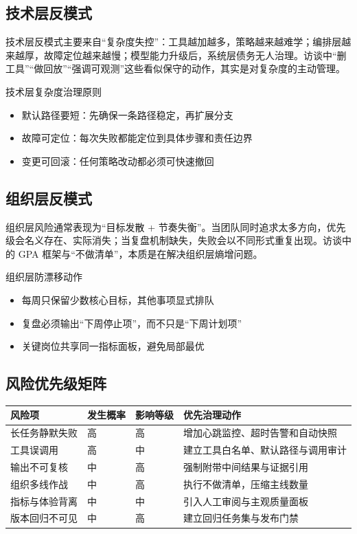 \documentclass[a4paper]{article}
\begin{document}
\subsection{技术层反模式}

技术层反模式主要来自“复杂度失控”：工具越加越多，策略越来越难学；编排层越来越厚，故障定位越来越慢；模型能力升级后，系统层债务无人治理。访谈中“删工具”“做回放”“强调可观测”这些看似保守的动作，其实是对复杂度的主动管理。

\begin{knowledgebox}{技术层复杂度治理原则}
\begin{itemize}
    \item 默认路径要短：先确保一条路径稳定，再扩展分支
    \item 故障可定位：每次失败都能定位到具体步骤和责任边界
    \item 变更可回滚：任何策略改动都必须可快速撤回
\end{itemize}
\end{knowledgebox}

\subsection{组织层反模式}

组织层风险通常表现为“目标发散 + 节奏失衡”。当团队同时追求太多方向，优先级会名义存在、实际消失；当复盘机制缺失，失败会以不同形式重复出现。访谈中的 GPA 框架与“不做清单”，本质是在解决组织层熵增问题。

\begin{importantbox}{组织层防漂移动作}
\begin{itemize}
    \item 每周只保留少数核心目标，其他事项显式排队
    \item 复盘必须输出“下周停止项”，而不只是“下周计划项”
    \item 关键岗位共享同一指标面板，避免局部最优
\end{itemize}
\end{importantbox}

\subsection{风险优先级矩阵}

\begin{center}
\begin{tabular}{p{3.2cm}p{2.1cm}p{2.1cm}p{5.4cm}}
\toprule
风险项 & 发生概率 & 影响等级 & 优先治理动作 \\
\midrule
长任务静默失败 & 高 & 高 & 增加心跳监控、超时告警和自动快照 \\
工具误调用 & 高 & 中 & 建立工具白名单、默认路径与调用审计 \\
输出不可复核 & 中 & 高 & 强制附带中间结果与证据引用 \\
组织多线作战 & 中 & 高 & 执行不做清单，压缩主线数量 \\
指标与体验背离 & 中 & 中 & 引入人工审阅与主观质量面板 \\
版本回归不可见 & 中 & 高 & 建立回归任务集与发布门禁 \\
\bottomrule
\end{tabular}
\end{center}
\end{document}

